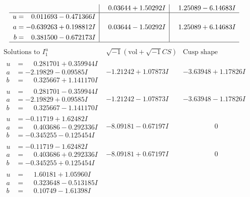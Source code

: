 \documentclass[1p]{elsarticle_modified}
\theoremstyle{definition}
\newcommand{\I}{\sqrt{-1}}
\begin{document}
$$\begin{array}{c|c|c}
 & \phantom{-}0.03644 + 1.50292 I & \phantom{-}1.25089 - 6.14683 I \\ \hline\begin{aligned}
u &= \phantom{-}0.011693 - 0.471366 I \\
a &= -0.639263 + 0.198812 I \\
b &= \phantom{-}0.381500 - 0.672173 I\end{aligned}
 & \phantom{-}0.03644 - 1.50292 I & \phantom{-}1.25089 + 6.14683 I\\
 \hline 
 \end{array}$$\newpage$$\begin{array}{c|c|c}  
\text{Solutions to }I^u_{1}& \I (\text{vol} + \sqrt{-1}CS) & \text{Cusp shape}\\
 \hline 
\begin{aligned}
u &= \phantom{-}0.281701 + 0.359944 I \\
a &= -2.19829 - 0.09585 I \\
b &= \phantom{-}0.325667 + 1.141170 I\end{aligned}
 & -1.21242 + 1.07873 I & -3.63948 + 1.17826 I \\ \hline\begin{aligned}
u &= \phantom{-}0.281701 - 0.359944 I \\
a &= -2.19829 + 0.09585 I \\
b &= \phantom{-}0.325667 - 1.141170 I\end{aligned}
 & -1.21242 - 1.07873 I & -3.63948 - 1.17826 I \\ \hline\begin{aligned}
u &= -0.11719 + 1.62482 I \\
a &= \phantom{-}0.403686 - 0.292336 I \\
b &= -0.345255 - 0.125454 I\end{aligned}
 & -8.09181 - 0.67197 I & \phantom{-0.000000 } 0 \\ \hline\begin{aligned}
u &= -0.11719 - 1.62482 I \\
a &= \phantom{-}0.403686 + 0.292336 I \\
b &= -0.345255 + 0.125454 I\end{aligned}
 & -8.09181 + 0.67197 I & \phantom{-0.000000 } 0 \\ \hline\begin{aligned}
u &= \phantom{-}1.60181 + 1.05960 I \\
a &= \phantom{-}0.323648 - 0.513185 I \\
b &= \phantom{-}0.10749 - 1.61398 I\end{aligned}

\end{array}$$
\end{document}
